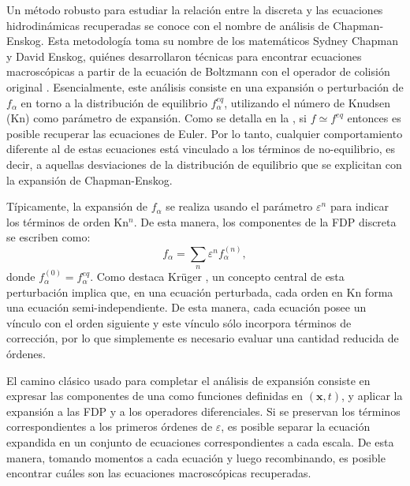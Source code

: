 Un m\'etodo robusto para estudiar la relaci\'on entre la \lbe{} discreta y las ecuaciones hidrodin\'amicas recuperadas se conoce con el nombre de an\'alisis de Chapman-Enskog. Esta metodolog\'ia toma su nombre de los matem\'aticos Sydney Chapman y David Enskog, qui\'enes desarrollaron t\'ecnicas para encontrar ecuaciones macrosc\'opicas a partir de la ecuaci\'on de Boltzmann con el operador de colisi\'on original \cite{chapman_mathematical_1970}. Esencialmente, este an\'alisis consiste en una expansi\'on o perturbaci\'on de $f_{\alpha}$ en torno a la distribuci\'on de equilibrio $f_{\alpha}^{eq}$, utilizando el n\'umero de Knudsen (Kn) como par\'ametro de expansi\'on. Como se detalla en la , si $f \simeq f^{eq}$ entonces es posible recuperar las ecuaciones de Euler. Por lo tanto, cualquier comportamiento diferente al de estas ecuaciones est\'a vinculado a los t\'erminos de no-equilibrio, es decir, a aquellas desviaciones de la distribuci\'on de equilibrio que se explicitan con la expansi\'on de Chapman-Enskog.

T\'ipicamente, la expansi\'on de $f_{\alpha}$ se realiza usando el par\'ametro $\varepsilon^n$ para indicar los t\'erminos de orden Kn$^n$. De esta manera, los componentes de la FDP discreta se escriben como:
\begin{equation}
	f_{\alpha} = \sum_{n} \varepsilon^{n} f_{\alpha}^{(n)},
	\label{eq:f_che_gral}
\end{equation}
donde $f_{\alpha}^{(0)} = f_{\alpha}^{eq}$. Como destaca Kr\"uger \cite{kruger_lattice_2017}, un concepto central de esta perturbaci\'on implica que, en una ecuaci\'on perturbada, cada orden en Kn forma una ecuaci\'on semi-independiente. De esta manera, cada ecuaci\'on posee un v\'inculo con el orden siguiente y este v\'inculo s\'olo incorpora t\'erminos de correcci\'on, por lo que simplemente es necesario evaluar una cantidad reducida de \'ordenes. 

El camino cl\'asico usado para completar el an\'alisis de expansi\'on consiste en expresar las componentes de una \lbe{} como funciones definidas en $(\bm{x},t)$, y aplicar la expansi\'on a las FDP y a los operadores diferenciales. Si se preservan los t\'erminos correspondientes a los primeros \'ordenes de $\varepsilon$, es posible separar la ecuaci\'on expandida en un conjunto de ecuaciones correspondientes a cada escala. De esta manera, tomando momentos a cada ecuaci\'on y luego recombinando, es posible encontrar cu\'ales son las ecuaciones macrosc\'opicas recuperadas.


